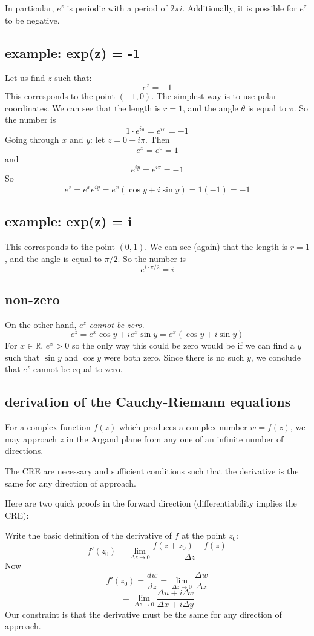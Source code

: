 \documentclass[11pt, oneside]{article}   	%
\begin{document}
In particular, $e^z$ is periodic with a period of $2 \pi i$.  Additionally, it is possible for $e^z$ to be negative.  
\subsection*{example:  exp(z) = -1}
Let us find $z$ such that:
\[ e^z = -1 \]
This corresponds to the point $(-1,0)$.  The simplest way is to use polar coordinates.  We can see that the length is $r = 1$, and the angle $\theta$ is equal to $\pi$.  So the number is
\[ 1 \cdot e^{i\pi} = e^{i\pi} = -1 \]
Going through $x$ and $y$:  let $z = 0 + i\pi$.  Then 
\[ e^x = e^0 = 1 \]
and
\[ e^{iy} = e^{i\pi} = -1 \]
So
\[ e^z = e^x e^{iy} = e^x(\cos y + i \sin y) = 1 (-1) = -1 \]
\subsection*{example: exp(z) = i}
This corresponds to the point $(0,1)$.  We can see (again) that the length is $r = 1$, and the angle is equal to $\pi/2$.  So the number is
\[ e^{i \cdot \pi/2} = i \]
\subsection*{non-zero}
On the other hand, $e^z$ \emph{cannot be zero}.
\[ e^z = e^x \cos y + i e^x \sin y = e^x(\cos y + i \sin y) \]
For $x \in \mathbb{R}$, $e^x > 0$ so the only way this could be zero would be if we can find a $y$ such that $\sin y$ and $\cos y$ were both zero.  Since there is no such $y$, we conclude that $e^z$ cannot be equal to zero.

\subsection*{derivation of the Cauchy-Riemann equations}
For a complex function $f(z)$ which produces a complex number $w = f(z)$, we may approach $z$ in the Argand plane from any one of an infinite number of directions.

The CRE are necessary and sufficient conditions such that the derivative is the same for any direction of approach.

Here are two quick proofs in the forward direction (differentiability implies the CRE):

Write the basic definition of the derivative of $f$ at the point $z_0$:
\[ f'(z_0) = \lim_{\Delta z \rightarrow 0} \frac{f(z + z_0) - f(z)}{\Delta z} \]
Now
\[ f'(z_0) =  \frac{dw}{dz} =   \lim_{\Delta z \rightarrow 0} \frac{\Delta w}{\Delta z} \]
\[ =  \lim_{\Delta z \rightarrow 0} \frac{\Delta u + i \Delta v}{\Delta x + i \Delta y} \]
Our constraint is that the derivative must be the same for any direction of approach.  
\end{document}
